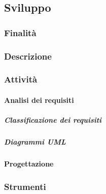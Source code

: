 \documentclass[../norme-di-progetto.tex]{subfiles}
\begin{document}
\subsection{Sviluppo}
\label{sub:sviluppo}
\subsubsection{Finalità}
\label{subs:finalità}
\subsubsection{Descrizione}
\label{subs:descrizione}
\subsubsection{Attività}
\label{subs:attività}
\paragraph{Analisi dei requisiti}
\label{par:analisi dei requisiti}
\subparagraph{Classificazione dei requisiti}
\label{subp:classificazione dei requisiti}
\subparagraph{Diagrammi UML}
\label{subp:diagrammi UML}
\paragraph{Progettazione}
\label{par:progettazione}
\subsubsection{Strumenti}
\label{subs:strumnti}
\end{document}
